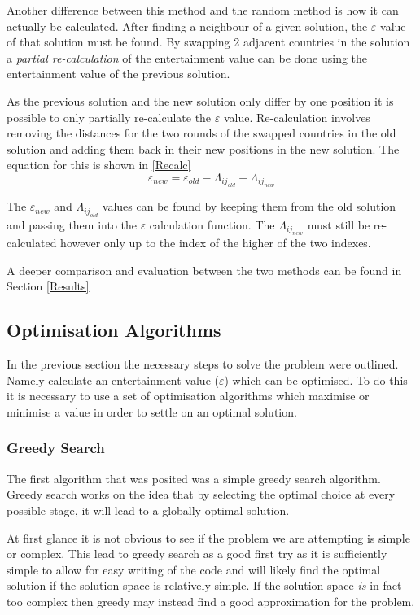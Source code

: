 \documentclass[12pt]{report}
\begin{document}
Another difference between this method and the random method is how it can actually be calculated. After finding a neighbour of a given solution, the $\varepsilon$ value of that solution must be found. By swapping 2 adjacent countries in the solution a \textit{partial re-calculation} of the entertainment value can be done using the entertainment value of the previous solution. 

As the previous solution and the new solution only differ by one position it is possible to only partially re-calculate the $\varepsilon$ value. Re-calculation involves removing the distances for the two rounds of the swapped countries in the old solution and adding them back in their new positions in the new solution. The equation for this is shown in \ref{Recalc}
\begin{equation}\label{Recalc}
	\varepsilon_{new} = \varepsilon_{old} - \Lambda_{ij_{old}} + \Lambda_{ij_{new}}
\end{equation}

The $\varepsilon_{new}$ and $\Lambda_{ij_{old}}$ values can be found by keeping them from the old solution and passing them into the $\varepsilon$ calculation function. The $\Lambda_{ij_{new}}$ must still be re-calculated however only up to the index of the higher of the two indexes.

A deeper comparison and evaluation between the two methods can be found in Section \ref{Results}

\subsection{Optimisation Algorithms}\label{Algorithms}
In the previous section the necessary steps to solve the problem were outlined. Namely calculate an entertainment value ($\varepsilon$) which can be optimised. To do this it is necessary to use a set of optimisation algorithms which maximise or minimise a value in order to settle on an optimal solution.

\subsubsection{Greedy Search}
The first algorithm that was posited was a simple greedy search algorithm. Greedy search works on the idea that by selecting the optimal choice at every possible stage, it will lead to a globally optimal solution. 

At first glance it is not obvious to see if the problem we are attempting is simple or complex. This lead to greedy search as a good first try as it is sufficiently simple to allow for easy writing of the code and will likely find the optimal solution if the solution space is relatively simple. If the solution space \textit{is} in fact too complex then greedy may instead find a good approximation for the problem.
\end{document}
